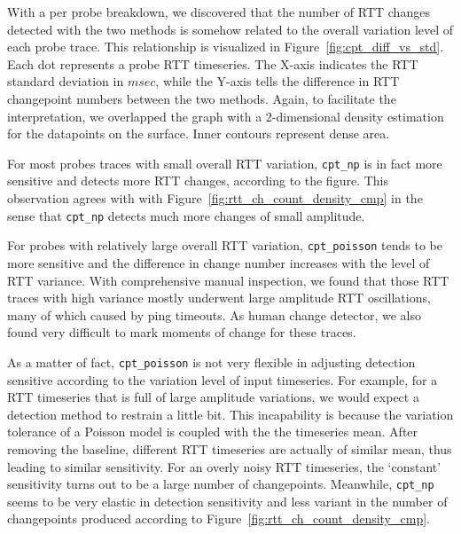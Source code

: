 With a per probe breakdown, we discovered that the number of RTT changes detected with the two methods is somehow related to the overall variation level of each probe trace.
This relationship is visualized in Figure~\ref{fig:cpt_diff_vs_std}.
Each dot represents a probe RTT timeseries. 
The X-axis indicates the RTT standard deviation in $msec$, while the Y-axis tells the difference in RTT changepoint numbers between the two methods.
Again, to facilitate the interpretation, we overlapped the graph with a 2-dimensional density estimation for the datapoints on the surface. Inner contours represent dense area.

For most probes traces with small overall RTT variation, \texttt{cpt\_np} is in fact more sensitive and detects more RTT changes, according to the figure.
This observation agrees with with Figure~\ref{fig:rtt_ch_count_density_cmp} in the sense that \texttt{cpt\_np} detects much more changes of small amplitude.

For probes with relatively large overall RTT variation, \texttt{cpt\_poisson} tends to be more sensitive and the difference in change number increases with the level of RTT variance.
With comprehensive manual inspection, we found that those RTT traces with high variance mostly underwent large amplitude RTT oscillations, many of which caused by ping timeouts. 
As human change detector, we also found very difficult to mark moments of change for these traces.

As a matter of fact, \texttt{cpt\_poisson} is not very flexible in adjusting detection sensitive according to the variation level of input timeseries.
For example, for a RTT timeseries that is full of large amplitude variations, 
we would expect a detection method to restrain a little bit.
This incapability is because the variation tolerance of a Poisson model is coupled with the the timeseries mean.
After removing the baseline, different RTT timeseries are actually of similar mean, thus leading to similar sensitivity.
For an overly noisy RTT timeseries, the `constant' sensitivity turns out to be a large number of changepoints.
Meanwhile, \texttt{cpt\_np} seems to be very elastic in detection sensitivity and less variant in the number of changepoints produced according to Figure~\ref{fig:rtt_ch_count_density_cmp}.

